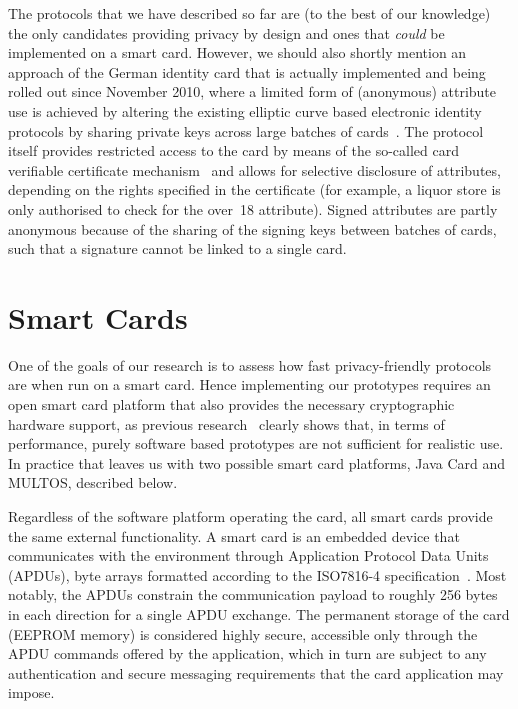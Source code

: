 The protocols that we have described so far are (to the best of our knowledge)
the only candidates providing privacy by design and ones that \emph{could} be
implemented on a smart card. However, we should also shortly mention an approach
of the German identity card that is actually implemented and being rolled out
since November 2010, where a limited form of (anonymous) attribute use is
achieved by altering the existing elliptic curve based electronic identity
protocols by sharing private keys across large batches of
cards~\cite{Kugler2010}. The protocol itself provides restricted access to the
card by means of the so-called card verifiable certificate
mechanism~\cite{EAC20} and allows for selective disclosure of attributes,
depending on the rights specified in the certificate (for example, a liquor
store is only authorised to check for the \textsf{over~18} attribute). Signed
attributes are partly anonymous because of the sharing of the signing keys
between batches of cards, such that a signature cannot be linked to a single
card.

\section{Smart Cards\label{sec:smartcards}}

One of the goals of our research is to assess how fast privacy-friendly
protocols are when run on a smart card. Hence implementing our prototypes
requires an open smart card platform that also provides the necessary
cryptographic hardware support, as previous research~\cite{TewsJacobs09} clearly
shows that, in terms of performance, purely software based prototypes are not
sufficient for realistic use. In practice that leaves us with two possible smart
card platforms, Java Card and MULTOS, described below.

Regardless of the software platform operating the card, all smart cards provide
the same external functionality. A smart card is an embedded device that
communicates with the environment through Application Protocol Data Units
(APDUs), byte arrays formatted according to the ISO7816-4
specification~\cite{ISO7816_4}. Most notably, the APDUs constrain the
communication payload to roughly 256 bytes in each direction for a single APDU
exchange. The permanent storage of the card (EEPROM memory) is considered
highly secure, accessible only through the APDU commands offered by the
application, which in turn are subject to any authentication and secure
messaging requirements that the card application may impose.

